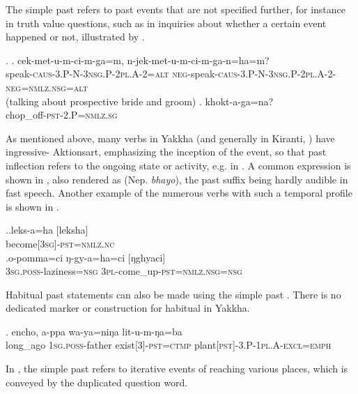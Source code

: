 The simple past  refers to past events that are not specified further, for instance in truth value questions, such as  in inquiries about whether a certain event happened or not, illustrated by \Next. 

\ex. \ag.  cek-met-u-m-ci-m-ga=m,                                    n-jek-met-u-m-ci-m-ga-n=ha=m?\\
speak{\scshape -caus-3.P-N-3nsg.P-2pl.A-2=alt} {\scshape neg-}speak{\scshape -caus-3.P-N-3nsg.P-2pl.A-2-neg=nmlz.nsg=alt}\\
 (talking about prospective bride and groom) 
\bg. khokt-a-ga=na?\\
chop\_off{\scshape -pst-2.P=nmlz.sg}\\
 


As mentioned above, many verbs in Yakkha (and generally in Kiranti, \citet[512]{Ebert2003Kiranti}) have ingressive- Aktionsart, emphasizing the inception of the event, so that past inflection refers to the ongoing state or activity, e.g. in \Last[b]. A common expression is shown in \Next[a], also rendered as  (Nep. \emph{bhayo}), the past suffix being hardly audible in fast speech. Another example of the numerous verbs with such a temporal profile is shown in \Next[b].

\ex.\ag.leks-a=ha [leksha]\\
become{\scshape [3sg]-pst=nmlz.nc}\\
\bg.o-pomma=ci ŋ-gy-a=ha=ci [ŋghyaci]\\
{\scshape 3sg.poss-}laziness{\scshape =nsg} {\scshape 3pl-}come\_up{\scshape -pst=nmlz.nsg=nsg}\\

Habitual past statements can also be made using the simple past \Next. There is no dedicated marker or construction for habitual  in Yakkha.

\exg. encho,        a-ppa             wa-ya=niŋa               lit-u-m-ŋa=ba\\
long\_ago {\scshape 1sg.poss-}father exist{\scshape [3]-pst=ctmp} plant{\scshape [pst]-3.P-1pl.A-excl=emph}\\
 

In \Next, the simple past refers to iterative events of reaching various places, which is conveyed by the duplicated question word.

